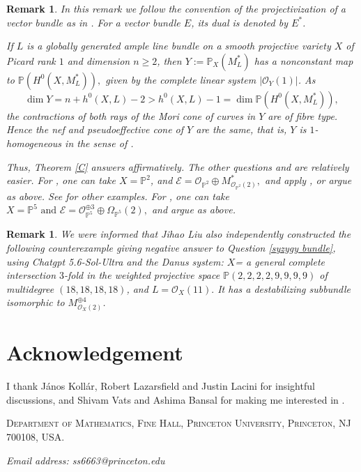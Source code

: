 \documentclass[11pt,letterpaper]{amsart}
\newtheorem{remark}[lemma]{Remark}
\begin{document}
\begin{remark}\label{answer}
In this remark we follow the convention of the projectivization of a vector bundle as in \cite[Chapter 2, Section 7]{hartshorne2013algebraic}. For a vector bundle $E$, its dual is denoted by $E^*$.

If $L$ is a globally generated ample line bundle on a smooth projective variety
$X$ of Picard rank $1$ and dimension $n\ge2$, then $Y:=\mathbb{P}_X(M_L^{*})$
has a nonconstant map to $\mathbb{P}\!\left(H^0(X,M_L^{*})\right),$
given by the complete linear system $|\mathcal{O}_Y(1)|$. As
\[
\dim Y
=
n+h^0(X,L)-2
>
h^0(X,L)-1
=
\dim \mathbb{P}\!\left(H^0(X,M_L^{*})\right),
\]
the contractions of both rays of the Mori cone of curves in $Y$ are of fibre type.
Hence the nef and pseudoeffective cone of $Y$ are the same, that is, $Y$ is $1$-homogeneous in the sense of
\cite{fulger2022positivity}.

Thus, Theorem \ref{C} answers \cite[Question 2(1)]{fulger2022positivity} affirmatively. The other questions \cite[Question 2(2)]{fulger2022positivity} and \cite[Question 2(3)]{fulger2022positivity} are relatively easier. For \cite[Question 2(2)]{fulger2022positivity}, one can take $X=\mathbb{P}^2$, and 
$\mathcal{E}=\mathcal{O}_{\mathbb{P}^2}\oplus M_{\mathcal{O}_{\mathbb{P}^2}(2)}^*,$
and apply \cite[Theorem 7.1]{bansal2024extremal}, or argue as above. See \cite{liu2026slope} for other
examples. For  \cite[Question 2(3)]{fulger2022positivity}, one can take $
X=\mathbb{P}^5
\text{ and }
\mathcal{E}
=
\mathcal{O}_{\mathbb{P}^5}^{\oplus 3}
\oplus
\Omega_{\mathbb{P}^5}(2),$
and argue as above.
\end{remark}
\begin{remark}
    We were informed that Jihao Liu also independently constructed the following counterexample giving negative answer to Question \ref{syzygy bundle},  using Chatgpt 5.6-Sol-Ultra and the Danus system:
    $X$= a general complete intersection $3$-fold in the weighted projective space $\mathbb{P}(2,2,2,2,9,9,9,9)$ of multidegree $(18,18,18,18)$, and $L=\mathcal{O}_X(11).$ It has a destabilizing subbundle isomorphic to $M_{\mathcal{O}_X(2)}^{\oplus 4}$.
\end{remark}
\section{Acknowledgement}
 I thank János Kollár, Robert Lazarsfield and Justin Lacini for insightful discussions, and Shivam Vats and Ashima Bansal for  making me interested in \cite[Question 2]{fulger2022positivity}.
\printbibliography
\vspace{40pt}
\begin{flushleft}
{\scshape Department of Mathematics, Fine Hall, Princeton University, Princeton, NJ 700108, USA}.

{\selectfont
\textit{Email address: ss6663@princeton.edu} }
\end{flushleft}
\end{document}
